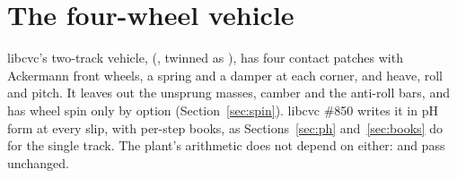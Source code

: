 \documentclass[11pt]{article}
\theoremstyle{remark}
\begin{document}
\section{The four-wheel vehicle}
\label{sec:four-wheel}

libcvc's two-track vehicle,  (, twinned
as ), has four contact patches with Ackermann front wheels, a spring and a
damper at each corner, and heave, roll and pitch. It leaves out the unsprung masses, camber and
the anti-roll bars, and has wheel spin only by option (Section~\ref{sec:spin}). libcvc \#850 writes it in pH form at every slip, with per-step
books, as Sections~\ref{sec:ph} and~\ref{sec:books} do for the single track. The plant's arithmetic
does not depend on either:  and  pass unchanged.
\end{document}
